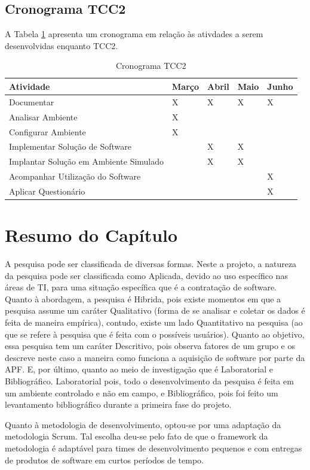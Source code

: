 \subsection{Cronograma TCC2}
A Tabela \ref{cronograma_tcc2} apresenta um cronograma em relação às ativdades a serem desenvolvidas enquanto TCC2.
\begin{table}[h!]
\centering
\caption{Cronograma TCC2}
\label{cronograma_tcc2}
\begin{tabular}{lllll}
\textbf{Atividade}                     & \textbf{Março} & \textbf{Abril} & \textbf{Maio} & \textbf{Junho} \\ \hline
Documentar                             & X              & X              & X             & X              \\ \hline
Analisar Ambiente                      & X              &                &               &                \\ \hline
Configurar Ambiente                    & X              &                &               &                \\ \hline
Implementar Solução de Software        &                & X              & X             &                \\ \hline
Implantar Solução em Ambiente Simulado &                & X              & X             &                \\ \hline
Acompanhar Utilização do Software      &                &                &               & X              \\ \hline
Aplicar Questionário                   &                &                &               & X              \\ \hline
\end{tabular}
\end{table}

\section{Resumo do Capítulo}
A pesquisa pode ser classificada de diversas formas. Neste a projeto, a natureza da pesquisa pode ser classificada como Aplicada, devido ao uso específico nas áreas de TI, para uma situação específica que é a contratação de software. Quanto à abordagem, a pesquisa é Hibrida, pois existe momentos em que a pesquisa assume um caráter Qualitativo (forma de se analisar e coletar os dados é feita de maneira empírica), contudo, existe um lado Quantitativo na pesquisa (ao que se refere à pesquisa que é feita com o possíveis usuários). Quanto ao objetivo, essa pesquisa tem um caráter Descritivo, pois observa fatores de um grupo e os descreve neste caso a maneira como funciona a aquisição de software por parte da APF. E, por último, quanto ao meio de investigação que é Laboratorial e Bibliográfico. Laboratorial pois, todo o desenvolvimento da pesquisa é feita em um ambiente controlado e não em campo, e Bibliográfico, pois foi feito um levantamento bibliográfico durante a primeira fase do projeto.

Quanto à metodologia de desenvolvimento, optou-se por uma adaptação da metodologia Scrum. Tal escolha deu-se pelo fato de que o framework da metodologia é adaptável para times de desenvolvimento pequenos e com entregas de produtos de software em curtos períodos de tempo.
